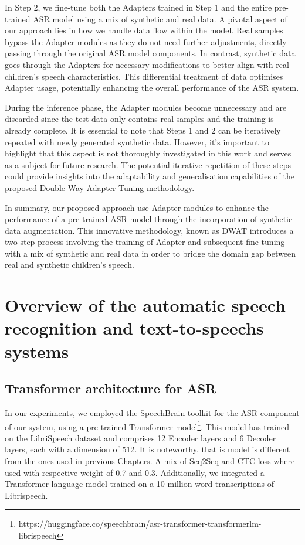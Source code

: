 In Step 2, we fine-tune both the Adapters trained in Step 1 and the entire pre-trained \ac{ASR} model using a mix of synthetic and real data. A pivotal aspect of our approach lies in how we handle data flow within the model. Real samples bypass the Adapter modules as they do not need further adjustments, directly passing through the original \ac{ASR} model components. In contrast, synthetic data goes through the Adapters for necessary modifications to better align with real children's speech characteristics. This differential treatment of data optimises Adapter usage, potentially enhancing the overall performance of the \ac{ASR} system.

During the inference phase, the Adapter modules become unnecessary and are discarded since the test data only contains real samples and the training is already complete. It is essential to note that Steps 1 and 2 can be iteratively repeated with newly generated synthetic data. However, it's important to highlight that this aspect is not thoroughly investigated in this work and serves as a subject for future research. The potential iterative repetition of these steps could provide insights into the adaptability and generalisation capabilities of the proposed Double-Way Adapter Tuning methodology.

In summary, our proposed approach use Adapter modules to enhance the performance of a pre-trained \ac{ASR} model through the incorporation of synthetic data augmentation. This innovative methodology, known as \ac{DWAT} introduces a two-step process involving the training of Adapter and subsequent fine-tuning with a mix of synthetic and real data in order to bridge the domain gap between real and synthetic children's speech.


\section{Overview of the automatic speech recognition and text-to-speechs systems}
\label{section:SOA}
\subsection{Transformer architecture for ASR}

In our experiments, we employed the SpeechBrain toolkit \cite{speechbrain} for the \ac{ASR} component of our system, using a pre-trained Transformer model\footnote{https://huggingface.co/speechbrain/asr-transformer-transformerlm-librispeech}. This model has trained on the LibriSpeech dataset \cite{librispeech} and comprises 12 Encoder layers and 6 Decoder layers, each with a dimension of 512. It is noteworthy, that is model is different from the ones used in previous Chapters. A mix of \ac{Seq2Seq} and \ac{CTC} loss where used with respective weight of 0.7 and 0.3. Additionally, we integrated a Transformer language model trained on a 10 million-word transcriptions of Librispeech.

